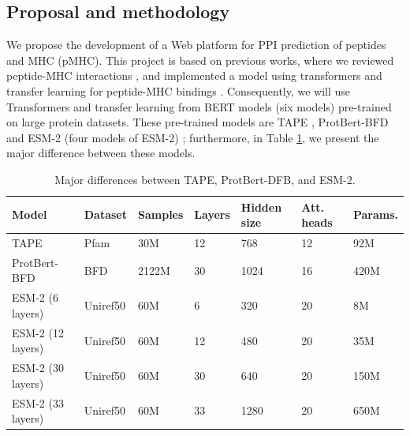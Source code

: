 \documentclass[a4paper,11pt]{article}
\begin{document}
\subsection{Proposal and methodology}

We propose the development of a Web platform for PPI prediction of peptides and MHC (pMHC). This project is based on previous works, where we reviewed peptide-MHC interactions \cite{machaca2023deep}, and implemented a model using transformers and transfer learning for peptide-MHC bindings \cite{arceda2023neoantigen}. Consequently, we will use Transformers and transfer learning from  BERT models (six models) pre-trained on large protein datasets. These pre-trained models are TAPE \cite{rao2019evaluating}, ProtBert-BFD \cite{elnaggar2021prottrans}  and ESM-2 \cite{lin2023evolutionary} (four models of ESM-2) ; furthermore, in Table \ref{tab:pretrained}, we present the major difference between these models.

\begin{table}[h]%
	\centering
	\caption{Major differences between TAPE, ProtBert-DFB, and ESM-2.\label{tab:pretrained}}%
	\begin{tabular}{lllllll}
		
		\textbf{Model}   & \textbf{Dataset} & \textbf{Samples} & \textbf{Layers} & \textbf{Hidden size} & \textbf{Att. heads} & \textbf{Params.} \\
		\midrule
		TAPE             & Pfam             & 30M                   & 12              & 768                  & 12                       & 92M                 \\
		ProtBert-BFD     & BFD              & 2122M                 & 30              & 1024                 & 16                       & 420M                \\
		ESM-2 (6 layers)  & Uniref50         & 60M                   & 6               & 320                  & 20                       & 8M                  \\
		ESM-2 (12 layers)  & Uniref50         & 60M                   & 12              & 480                  & 20                       & 35M                 \\
		ESM-2 (30 layers) & Uniref50         & 60M                   & 30              & 640                  & 20                       & 150M                \\
		ESM-2 (33 layers)  & Uniref50         & 60M                   & 33              & 1280                 & 20                       & 650M               \\
	
	\end{tabular}
	
\end{table}
\end{document}
